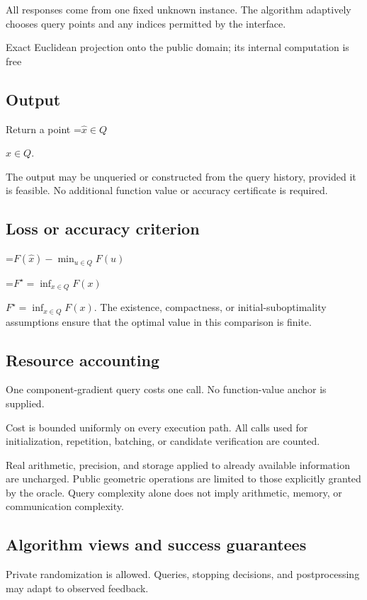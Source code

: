 \documentclass[10pt,a4paper]{article}
\newcommand{\AtlasMath}[1]{\par\begingroup\centering\setbox0=\hbox{$\displaystyle #1$}\ifdim\wd0>1.4\linewidth\typeout{ATLAS WIDE FORMULA: \the\wd0}\fi\ifdim\wd0>\linewidth\resizebox{\linewidth}{!}{\box0}\else\box0\fi\par\endgroup}
\newcommand{\AtlasInlineMath}[1]{\begingroup\setbox0=\hbox{$#1$}\ifdim\wd0>.4\linewidth\endgroup\AtlasMath{#1}\else\endgroup$#1$\fi}
\begin{document}
All responses come from one fixed unknown instance. The algorithm adaptively chooses query points and any indices permitted by the interface.

Exact Euclidean projection onto the public domain; its internal computation is free

\subsection{Output}
Return a point \AtlasInlineMath{\widehat x\in Q}.

The output may be unqueried or constructed from the query history, provided it is feasible. No additional function value or accuracy certificate is required.

\subsection{Loss or accuracy criterion}

\AtlasMath{F(\widehat{x})-\min_{u\in Q}F(u)}


\AtlasInlineMath{F^\star=\inf_{x\in Q}F(x)}. The existence, compactness, or initial-suboptimality assumptions ensure that the optimal value in this comparison is finite.

\subsection{Resource accounting}
One component-gradient query costs one call. No function-value anchor is supplied.

Cost is bounded uniformly on every execution path. All calls used for initialization, repetition, batching, or candidate verification are counted.

Real arithmetic, precision, and storage applied to already available information are uncharged. Public geometric operations are limited to those explicitly granted by the oracle. Query complexity alone does not imply arithmetic, memory, or communication complexity.

\subsection{Algorithm views and success guarantees}
Private randomization is allowed. Queries, stopping decisions, and postprocessing may adapt to observed feedback.
\end{document}
